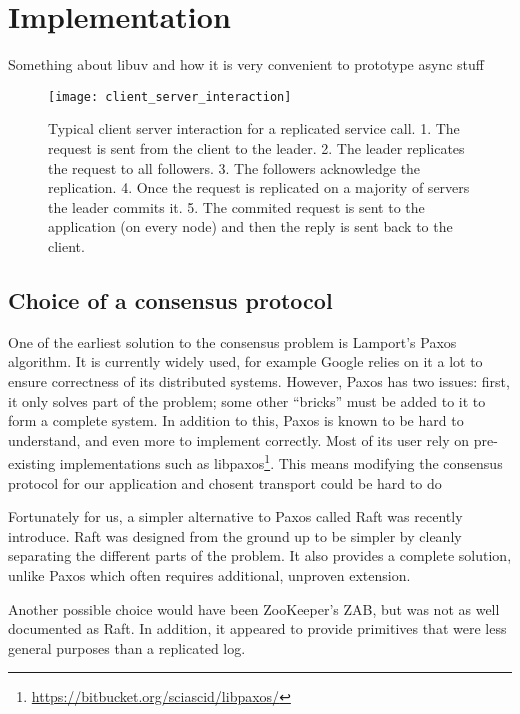 \chapter{Implementation}
\label{chap:implementation}

Something about libuv and how it is very convenient to prototype async stuff


\begin{figure}[h]
    \centering
    \texttt{[image: client\_server\_interaction]}
    \caption{Typical client server interaction for a replicated service call.
        1. The request is sent from the client to the leader.
        2. The leader replicates the request to all followers.
        3. The followers acknowledge the replication.
        4. Once the request is replicated on a majority of servers the leader commits it.
        5. The commited request is sent to the application (on every node) and then the reply is sent back to the client.
    \label{fig:client-server-interaction}
    }
\end{figure}

\section{Choice of a consensus protocol}

One of the earliest solution to the consensus problem is Lamport's Paxos algorithm\cite{paxos}.
It is currently widely used, for example Google relies on it a lot to ensure correctness of its distributed systems\cite{chubby, paxoslive}.
However, Paxos has two issues: first, it only solves part of the problem; some other ``bricks'' must be added to it to form a complete system.
In addition to this, Paxos is known to be hard to understand, and even more to implement correctly.
Most of its user rely on pre-existing implementations such as libpaxos\footnote{\url{https://bitbucket.org/sciascid/libpaxos/}}.
This means modifying the consensus protocol for our application and chosent transport could be hard to do

Fortunately for us, a simpler alternative to Paxos called Raft was recently introduce\cite{raft}.
Raft was designed from the ground up to be simpler by cleanly separating the different parts of the problem.
It also provides a complete solution, unlike Paxos which often requires additional, unproven extension\cite{paxoslive}.

Another possible choice would have been ZooKeeper's ZAB\cite{zookeeper}, but was not as well documented as Raft.
In addition, it appeared to provide primitives that were less general purposes than a replicated log.

